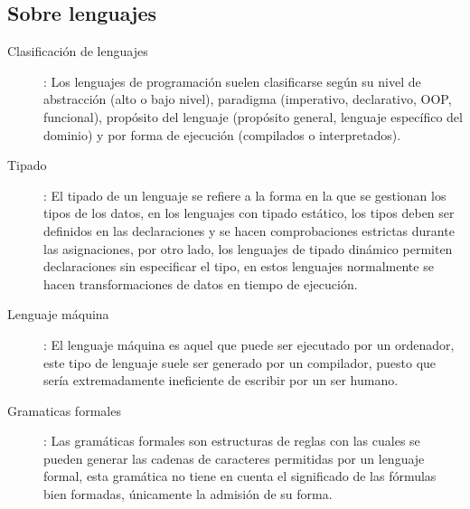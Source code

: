 
\subsection{Sobre lenguajes}
\begin{description}
    \item [Clasificación de lenguajes]: Los lenguajes de programación suelen clasificarse según su nivel de abstracción (alto o bajo nivel), paradigma (imperativo, declarativo, OOP, funcional), propósito del lenguaje (propósito general, lenguaje específico del dominio) y por forma de ejecución (compilados o interpretados).  
    \item [Tipado]: El tipado de un lenguaje se refiere a la forma en la que se gestionan los tipos de los datos, en los lenguajes con tipado estático, los tipos deben ser definidos en las declaraciones y se hacen comprobaciones estrictas durante las asignaciones, por otro lado, los lenguajes de tipado dinámico permiten declaraciones sin especificar el tipo, en estos lenguajes normalmente se hacen transformaciones de datos en tiempo de ejecución. 
    \item [Lenguaje máquina]: El lenguaje máquina es aquel que puede ser ejecutado por un ordenador, este tipo de lenguaje suele ser generado por un compilador, puesto que sería extremadamente ineficiente de escribir por un ser humano.
    \item [Gramaticas formales]: Las gramáticas formales son estructuras de reglas con las cuales se pueden generar las cadenas de caracteres permitidas por un lenguaje formal, esta gramática no tiene en cuenta el significado de las fórmulas bien formadas, únicamente la admisión de su forma.
\end{description}

